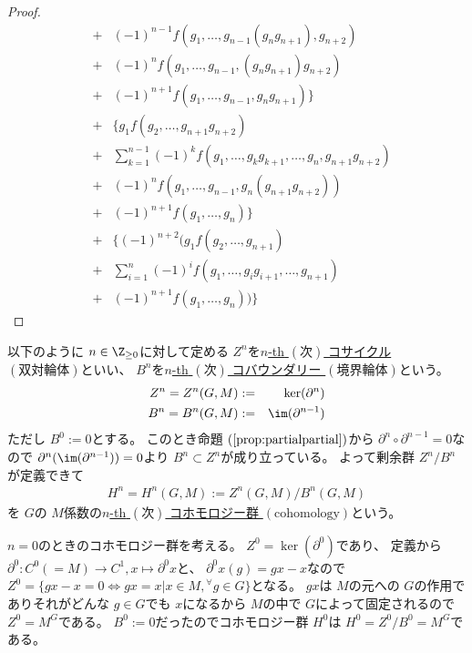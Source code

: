 \documentclass[../master_galois_theory]{subfiles}
\begin{document}
\begin{proof}
\begin{eqnarray*}
  & + & (-1)^{n-1} f(g_1 , \dots , g_{n-1} (g_n g_{n+1}) , g_{n+2}) \\
  & + & (-1)^n f(g_1 , \dots , g_{n-1} , (g_n g_{n+1}) g_{n+2}) \\
  & + & (-1)^{n+1} f(g_1 , \dots , g_{n-1} , g_n g_{n+1}) \} \\
  & + & \{ g_1 f(g_2 , \dots , g_{n+1} g_{n+2}) \\
  & + & \sum_{k=1}^{n-1} (-1)^k f(g_1 , \dots , g_k g_{k+1} , \dots , g_n , g_{n+1} g_{n+2}) \\
  & + & (-1)^n f(g_1 , \dots , g_{n-1} , g_n (g_{n+1} g_{n+2})) \\
  & + & (-1)^{n+1} f(g_1 , \dots , g_n) \} \\
  & + & \{ (-1)^{n+2} (g_1 f(g_2 , \dots , g_{n+1}) \\
  & + & \sum_{i=1}^n (-1)^i f(g_1 , \dots , g_i g_{i+1} , \dots , g_{n+1}) \\
  & + & (-1)^{n+1} f(g_1 , \dots , g_n) ) \}
\end{eqnarray*}
\end{proof}

\begin{defi} \label{defi:cohomology}
  以下のように $ n \in \Z_{\geq 0}$に対して定める $Z^n$を\underline{$n$\rm{-th} $(次)$ コサイクル $(双対輪体)$}といい、
  $B^n$を\underline{$n$\rm{-th} $(次)$ コバウンダリー $(境界輪体)$}という。
  \begin{eqnarray*}
    Z^n = Z^n(G,M) & := & \ker(\partial^n) \\
    B^n = B^n(G,M) & := & \im(\partial^{n-1}) \\
  \end{eqnarray*}
  ただし $B^0 := 0$とする。
  このとき命題 $(\mathrm{\ref{prop:partialpartial}})$から
  $\partial^n \circ \partial^{n-1} = 0$なので $\partial^n(\im(\partial^{n-1})) = 0$より $B^n \subset Z^n$が成り立っている。
  よって剰余群 $Z^n/B^n$が定義できて
  \begin{eqnarray*}
    H^n = H^n(G,M) := Z^n(G,M)/B^n(G,M)
  \end{eqnarray*}
  を $G$の $M$係数の\underline{$n$\rm{-th} $(次)$ コホモロジー群 $(\mathrm{cohomology})$}という。
\end{defi}

\begin{exam} \label{exam:cohomology0}
  $n=0$のときのコホモロジー群を考える。
  $Z^0 = \ker(\partial^0)$であり、
  定義から
  $\partial^0 : C^0 (= M) \longrightarrow C^1 , x \longmapsto \partial^0 x$と、
  $\partial^0 x(g) = gx - x$なので
  $Z^0 = \{ gx - x = 0 \Leftrightarrow gx = x | x \in M , {}^\forall g \in G \}$となる。
  $gx$は $M$の元への $G$の作用でありそれがどんな $g \in G$でも $x$になるから
  $M$の中で $G$によって固定されるので $Z^0 = M^G$である。
  $B^0 := 0$だったのでコホモロジー群 $H^0$は $H^0 = Z^0/B^0 = M^G$である。
\end{exam}
\end{document}

